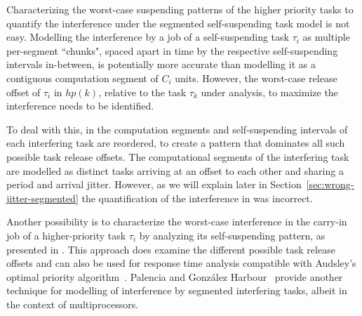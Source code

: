 
Characterizing the worst-case 
suspending patterns of the higher priority tasks to quantify the interference under the segmented self-suspending task model is not easy. 
Modelling the interference by a job of a self-suspending task $\tau_i$ as multiple per-segment ``chunks", spaced apart in time by 
the respective self-suspending intervals in-between, is potentially more accurate than modelling it as a contiguous computation segment of $C_i$ units.
However, the worst-case release offset of $\tau_i$ in $hp(k)$, relative to the task $\tau_k$ under analysis, to maximize the interference needs to be identified.

To deal with this, in \cite{RTCSA-BletsasA05} the computation segments and self-suspending intervals of each interfering task are reordered, 
to create a pattern that dominates all such possible task release offsets. The computational segments of the interfering task are modelled 
as distinct tasks arriving at an offset to each other and sharing a period and arrival jitter. However, as we will explain later in 
Section~\ref{sec:wrong-jitter-segmented} the quantification of the interference in \cite{RTCSA-BletsasA05} was incorrect. 

Another possibility is to characterize the worst-case interference in the carry-in job of a higher-priority task $\tau_i$ by analyzing 
its self-suspending pattern, as presented in \cite{Huang:multiseg}. This approach does examine the different possible task release offsets
and can also be used for response time analysis compatible with Audsley's optimal priority algorithm~\cite{Audsley1991aOPA}.
Palencia and Gonz\'alez Harbour~\cite{PH:rtss98} provide another technique for modelling of interference by segmented interfering tasks, 
albeit in the context of multiprocessors. %

